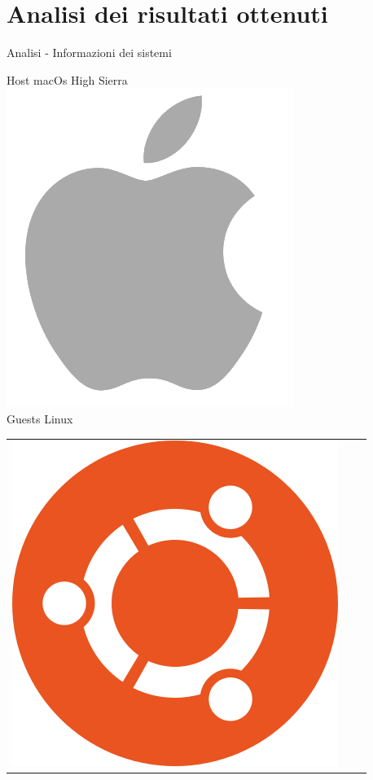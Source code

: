 \documentclass[12pt]{beamer}
\begin{document}
  \section{Analisi dei risultati ottenuti}
  \begin{frame}[fragile]{Analisi - Informazioni dei sistemi}
    \begin{center}
    	Host macOs High Sierra\\
    	\includegraphics[scale=0.15]{res/Apple}\\
    	Guests Linux\\
    	\begin{tabular}{ c c c }
    		\includegraphics[scale=0.14]{res/Ubuntu} &

\end{tabular}
\end{center}
\end{frame}
\end{document}
